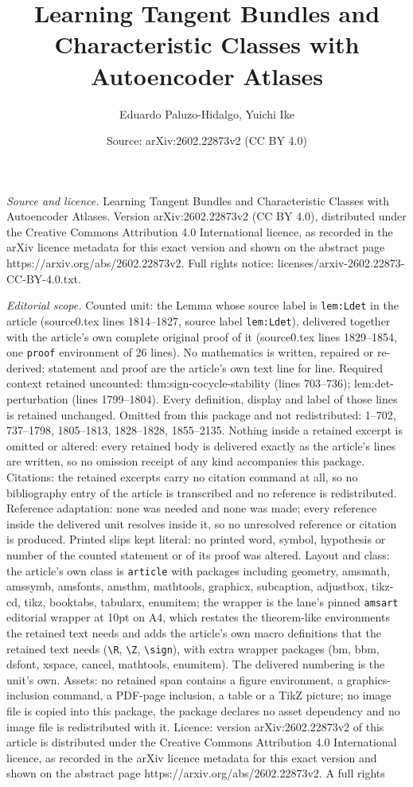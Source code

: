 \documentclass[10pt,a4paper]{amsart}
\title[Learning Tangent Bundles and Characteristic Classes with Aut]{Learning Tangent Bundles and Characteristic Classes with Autoencoder Atlases}
\author{Eduardo Paluzo-Hidalgo, Yuichi Ike}
\date{Source: arXiv:2602.22873v2 (CC BY 4.0)}
\begin{document}
\maketitle

\noindent\emph{Source and licence.} Learning Tangent Bundles and Characteristic Classes with Autoencoder Atlases. Version arXiv:2602.22873v2 (CC BY 4.0), distributed under the Creative Commons Attribution 4.0 International licence, as recorded in the arXiv licence metadata for this exact version and shown on the abstract page https://arxiv.org/abs/2602.22873v2. Full rights notice: licenses/arxiv-2602.22873-CC-BY-4.0.txt.\par\smallskip

\noindent\textit{Editorial scope.} Counted unit: the Lemma whose source label is \texttt{lem:Ldet} in the article (source0.tex lines 1814--1827, source label \texttt{lem:Ldet}), delivered together with the article's own complete original proof of it (source0.tex lines 1829--1854, one \texttt{proof} environment of 26 lines). No mathematics is written, repaired or re-derived: statement and proof are the article's own text line for line. Required context retained uncounted: thm:sign-cocycle-stability (lines 703--736); lem:det-perturbation (lines 1799--1804). Every definition, display and label of those lines is retained unchanged. Omitted from this package and not redistributed: 1--702, 737--1798, 1805--1813, 1828--1828, 1855--2135. Nothing inside a retained excerpt is omitted or altered: every retained body is delivered exactly as the article's lines are written, so no omission receipt of any kind accompanies this package. Citations: the retained excerpts carry no citation command at all, so no bibliography entry of the article is transcribed and no reference is redistributed. Reference adaptation: none was needed and none was made; every reference inside the delivered unit resolves inside it, so no unresolved reference or citation is produced. Printed slips kept literal: no printed word, symbol, hypothesis or number of the counted statement or of its proof was altered. Layout and class: the article's own class is \texttt{article} with packages including geometry, amsmath, amssymb, amsfonts, amsthm, mathtools, graphicx, subcaption, adjustbox, tikz-cd, tikz, booktabs, tabularx, enumitem; the wrapper is the lane's pinned \texttt{amsart} editorial wrapper at 10pt on A4, which restates the theorem-like environments the retained text needs and adds the article's own macro definitions that the retained text needs (\texttt{\textbackslash R}, \texttt{\textbackslash Z}, \texttt{\textbackslash sign}), with extra wrapper packages (bm, bbm, dsfont, xspace, cancel, mathtools, enumitem). The delivered numbering is the unit's own. Assets: no retained span contains a figure environment, a graphics-inclusion command, a PDF-page inclusion, a table or a TikZ picture; no image file is copied into this package, the package declares no asset dependency and no image file is redistributed with it. Licence: version arXiv:2602.22873v2 of this article is distributed under the Creative Commons Attribution 4.0 International licence, as recorded in the arXiv licence metadata for this exact version and shown on the abstract page https://arxiv.org/abs/2602.22873v2. A full rights 
\end{document}
